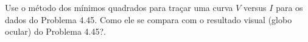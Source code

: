 Use o método dos mínimos quadrados para traçar uma curva $V$ versus $I$ para os dados do Problema 4.45. Como ele se compara com o resultado visual (globo ocular) do Problema 4.45?.


